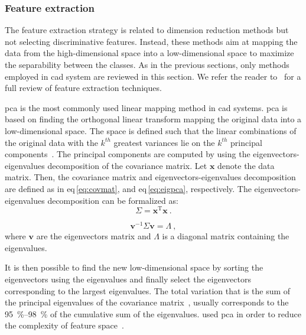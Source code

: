 \subsubsection{Feature extraction}\label{subsubsec:chp3:img-clas:CADX:fea-ext:ext}
The feature extraction strategy is related to dimension reduction methods but
not selecting discriminative features.
Instead, these methods aim at mapping the data from the high-dimensional space
into a low-dimensional space to maximize the separability between the classes.
As in the previous sections, only methods employed in \ac{cad} system are
reviewed in this section.
We refer the reader to~\cite{Fodor2002} for a full review of feature extraction
techniques.

\ac{pca} is the most commonly used linear mapping method in \ac{cad} systems.
\ac{pca} is based on finding the orthogonal linear transform mapping the
original data into a low-dimensional space.
The space is defined such that the linear combinations of the original data
with the $k^{th}$ greatest variances lie on the $k^{th}$ principal
components~\cite{Jolliffe2002}.
The principal components are computed by using the eigenvectors-eigenvalues
decomposition of the covariance matrix.
Let $\mathbf{x}$ denote the data matrix.
Then, the covariance matrix and eigenvectors-eigenvalues decomposition are
defined as in \acs{eq}\,\eqref{eq:covmat}, and \acs{eq}\,\eqref{eq:eigpca},
respectively.
The eigenvectors-eigenvalues decomposition can be formalized as:
\begin{equation}
  \Sigma = \mathbf{x}^{\text{T}} \mathbf{x} \ .
  \label{eq:covmat}
\end{equation}

\begin{equation}
  \mathbf{v}^{-1} \Sigma \mathbf{v} = \Lambda \ ,
  \label{eq:eigpca}
\end{equation}
\noindent where $\mathbf{v}$ are the eigenvectors matrix and $\Lambda$ is a
diagonal matrix containing the eigenvalues.

It is then possible to find the new low-dimensional space by sorting the
eigenvectors using the eigenvalues and finally select the eigenvectors
corresponding to the largest eigenvalues.
The total variation that is the sum of the principal eigenvalues of the
covariance matrix~\cite{Fodor2002}, usually corresponds to the
\SIrange{95}{98}{\percent} of the cumulative sum of the eigenvalues.
\citeauthor{Tiwari2012} used \ac{pca} in order to reduce the complexity of
feature space~\cite{Tiwari2008,Tiwari2009,Tiwari2012,Lemaitre2016thesis}.

